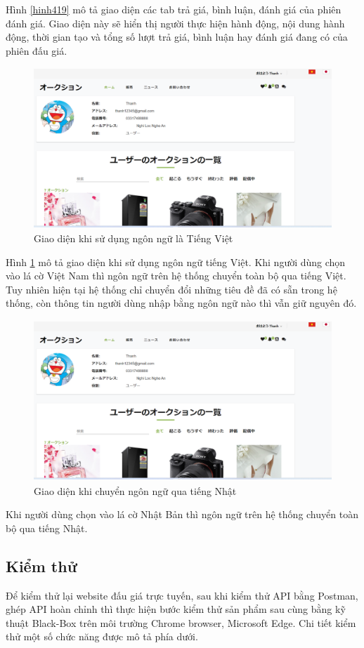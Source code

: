 \documentclass{article}
\begin{document}
Hình \ref{hinh419} mô tả giao diện các tab trả giá, bình luận, đánh giá của phiên đánh giá. Giao diện này sẽ hiển thị người thực hiện hành động, nội dung hành động, thời gian tạo và tổng số lượt trả giá, bình luận hay đánh giá đang có của phiên đấu giá. 
\begin{figure}[H]
    \centering
    \includegraphics[width=11.4cm,height=6.06cm]{images/jp.png}
    \caption{Giao diện khi sử dụng ngôn ngữ là Tiếng Việt}
    \label{hinh420}
\end{figure}
Hình \ref{hinh420} mô tả giao diện khi sử dụng ngôn ngữ tiếng Việt. Khi người dùng chọn vào lá cờ Việt Nam thì ngôn ngữ trên hệ thống chuyển toàn bộ qua tiếng Việt. Tuy nhiên hiện tại hệ thống chỉ chuyển đổi những tiêu đề đã có sẵn trong hệ thống, còn thông tin người dùng nhập bằng ngôn ngữ nào thì vẫn giữ nguyên đó.
\begin{figure}[H]
    \centering
    \includegraphics[width=11.4cm,height=6.06cm]{images/jp.png}
    \caption{Giao diện khi chuyển ngôn ngữ qua tiếng Nhật}
    \label{hinh421}
\end{figure}
Khi người dùng chọn vào lá cờ Nhật Bản thì ngôn ngữ trên hệ thống chuyển toàn bộ qua tiếng Nhật.
\subsection{Kiểm thử}
Để kiểm thử lại website đấu giá trực tuyến, sau khi kiểm thử API bằng Postman, ghép API hoàn chỉnh thì thực hiện bước kiểm thử sản phẩm sau cùng bằng kỹ thuật Black-Box trên môi trường Chrome browser, Microsoft Edge. Chi tiết kiểm thử một số chức năng được mô tả phía dưới. 
\end{document}
